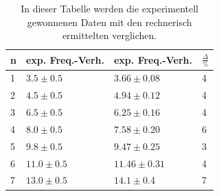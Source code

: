 \documentclass[11pt,ngerman,a4paper]{article}
\begin{document}
\begin{table}[h]
\begin{tabular}{llll}
\toprule
{n} &{exp. Freq.-Verh.} &{exp. Freq.-Verh.} &{$\frac{\Delta}{\si{\percent}}$}\\
\midrule
1 & $3.5 \pm 0.5$  & $3.66 \pm 0.08$  & 4 \\
2 & $4.5 \pm 0.5$  & $4.94 \pm 0.12$  & 4\\
3 & $6.5 \pm 0.5$  & $6.25 \pm 0.16$  & 4  \\
4 & $8.0 \pm 0.5$  & $7.58 \pm 0.20$  & 6 \\
5 & $9.8 \pm 0.5$  & $9.47 \pm 0.25$  & 3 \\
6 & $11.0 \pm 0.5$  & $11.46 \pm 0.31$ & 4 \\
7 & $13.0 \pm 0.5$  & $14.1 \pm 0.4$  & 7 \\
\bottomrule
\end{tabular}
\label{tab3}
\caption{In dieser Tabelle werden die experimentell gewonnenen Daten mit den rechnerisch ermittelten verglichen.}
 \end{table}
 
\end{document}
